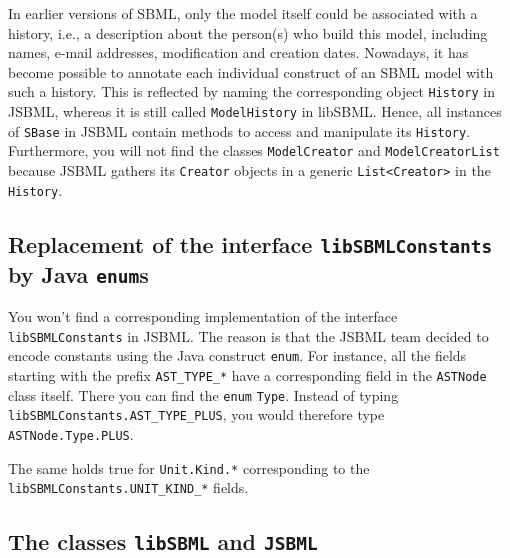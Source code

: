 In earlier versions of SBML, only the model itself could be
associated with a history, i.e., a description about the person(s) who build
this model, including names, e-mail addresses, modification and creation dates.
Nowadays, it has become possible to annotate each individual construct of an
SBML model with such a history. This is reflected by naming the corresponding
object \texttt{History}
in JSBML, whereas it is still called
\texttt{ModelHistory} in libSBML. Hence,
all instances of \texttt{SBase} in JSBML
 contain methods to access and
manipulate its \texttt{History}. Furthermore, you will not find the classes
\texttt{ModelCreator} and \texttt{ModelCreatorList} because
JSBML
gathers its \texttt{Creator} objects
in a generic \texttt{List<Creator>} in the
\texttt{History}.


\subsection{Replacement of the interface \texttt{libSBMLConstants} by Java \texttt{enum}s}

You won't find a corresponding implementation of the interface
\texttt{libSBMLConstants} in JSBML. The reason is that the JSBML team decided to
encode constants
%
using the Java construct \texttt{enum}. For instance, all the fields starting
with the prefix \texttt{AST\_TYPE\_*}
%
have a corresponding field in the \texttt{ASTNode} class itself. There you can
find the \texttt{enum} \texttt{Type}.
%
Instead of typing \texttt{libSBMLConstants.AST\_TYPE\_PLUS}, you would therefore
type \texttt{ASTNode.Type.PLUS}.

The same holds true for \texttt{Unit.Kind.*} corresponding to the
\texttt{libSBMLConstants.UNIT\_KIND\_*}
%
fields.

\subsection{The classes \texttt{libSBML} and \texttt{JSBML}}

